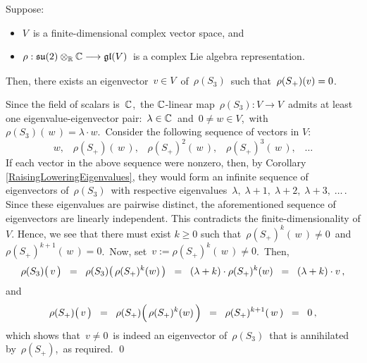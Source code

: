 \vskip 0.5cm
\begin{corollary}
\label{EigenvectorOfS3KilledBySplus}
\mbox{}
\vskip 0.1cm
\noindent
Suppose:
\begin{itemize}
\item
	$V$\, is a {\color{red}finite-dimensional} complex vector space, and
\item
	$\rho : \mathfrak{su}(2) \otimes_{\mathbb{R}} \mathbb{C} \longrightarrow \mathfrak{gl}(V)$\,
	is a complex Lie algebra representation.
\end{itemize}
Then, there exists an eigenvector \,$v \in V$\, of \,$\rho(S_{3})$\, such that
\,$\rho(\overset{{\color{white}.}}{S}_{+})(v) = 0$.\,
\end{corollary}
\proof
Since the field of scalars is \,$\mathbb{C}$,\, the $\mathbb{C}$-linear map
\,$\rho(S_{3}) : V \longrightarrow V$\,
admits at least one eigenvalue-eigenvector pair: \,$\lambda \in \mathbb{C}$\, and \,$0 \neq w \in V$,\,
with \,$\rho(S_{3})(\,w\,) = \lambda \cdot w$.\,
Consider the following sequence of vectors in $V$:
\begin{equation*}
w,\;\;\; \rho(S_{+})(\,w\,),\;\;\; \rho(S_{+})^{2}(\,w\,),\;\;\; \rho(S_{+})^{3}(\,w\,),\;\;\; \ldots
\end{equation*}
If each vector in the above sequence were nonzero, then,
by Corollary \ref{RaisingLoweringEigenvalues}, they would form an infinite sequence of eigenvectors of
\,$\rho(S_{3})$\, with respective eigenvalues \,$\lambda,\;\lambda+1,\;\lambda+2,\;\lambda+3,\;\ldots$\,.
Since these eigenvalues are pairwise distinct, the aforementioned sequence of eigenvectors are linearly independent.
This contradicts the finite-dimensionality of $V$.
Hence, we see that there must exist $k \geq 0$ such that
\,$\rho(S_{+})^{k}(\,w\,) \neq 0$\, and \,$\rho(S_{+})^{k+1}(\,w\,) = 0$.\,
Now, set \,$v := \rho(S_{+})^{k}(\,w\,) \neq 0$.\,
Then,
\begin{equation*}
\rho(S_{3})\!\left(\,\overset{{\color{white}.}}{v}\,\right)
\;\; = \;\;
	\rho(S_{3})\!\left(\,\rho(S_{+})^{k}(\overset{{\color{white}.}}{w})\,\right)
\;\; = \;\;
	(\lambda + k) \cdot \rho(S_{+})^{k}(\overset{{\color{white}.}}{w})
\;\; = \;\;
	(\lambda + k) \cdot v\,,
\end{equation*}
and
\begin{equation*}
\rho(S_{+})\!\left(\,\overset{{\color{white}.}}{v}\,\right)
\;\; = \;\;
	\rho(S_{+})\!\left(\,\overset{{\color{white}1}}{\rho}(S_{+})^{k}(w)\,\right)
\;\; = \;\;
	\rho(S_{+})^{k+1}(\,w\,)
\;\; = \;\;
	0\,,
\end{equation*}
which shows that \,$v \neq 0$\, is indeed an eigenvector of \,$\rho(S_{3})$\, that is annihilated by
\,$\rho(S_{+})$,\, as required.
\qed

